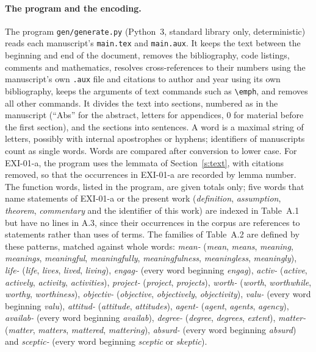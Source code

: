 \paragraph{The program and the encoding.} The program \texttt{gen/generate.py} (Python~3, standard library only, deterministic) reads each manuscript's \texttt{main.tex} and \texttt{main.aux}. It keeps the text between the beginning and end of the document, removes the bibliography, code listings, comments and mathematics, resolves cross-references to their numbers using the manuscript's own \texttt{.aux} file and citations to author and year using its own bibliography, keeps the arguments of text commands such as \texttt{\textbackslash emph}, and removes all other commands. It divides the text into sections, numbered as in the manuscript (\enquote{Abs} for the abstract, letters for appendices, 0 for material before the first section), and the sections into sentences. A word is a maximal string of letters, possibly with internal apostrophes or hyphens; identifiers of manuscripts count as single words. Words are compared after conversion to lower case. For EXI-01-a, the program uses the lemmata of Section~\ref{s:text}, with citations removed, so that the occurrences in EXI-01-a are recorded by lemma number. The function words, listed in the program, are given totals only; five words that name statements of EXI-01-a or the present work (\emph{definition}, \emph{assumption}, \emph{theorem}, \emph{commentary} and the identifier of this work) are indexed in Table~A.1 but have no lines in A.3, since their occurrences in the corpus are references to statements rather than uses of terms. The families of Table~A.2 are defined by these patterns, matched against whole words: \textit{mean-} (\emph{mean}, \emph{means}, \emph{meaning}, \emph{meanings}, \emph{meaningful}, \emph{meaningfully}, \emph{meaningfulness}, \emph{meaningless}, \emph{meaningly}), \textit{life-} (\emph{life}, \emph{lives}, \emph{lived}, \emph{living}), \textit{engag-} (every word beginning \emph{engag}), \textit{activ-} (\emph{active}, \emph{actively}, \emph{activity}, \emph{activities}), \textit{project-} (\emph{project}, \emph{projects}), \textit{worth-} (\emph{worth}, \emph{worthwhile}, \emph{worthy}, \emph{worthiness}), \textit{objectiv-} (\emph{objective}, \emph{objectively}, \emph{objectivity}), \textit{valu-} (every word beginning \emph{valu}), \textit{attitud-} (\emph{attitude}, \emph{attitudes}), \textit{agent-} (\emph{agent}, \emph{agents}, \emph{agency}), \textit{availab-} (every word beginning \emph{availab}), \textit{degree-} (\emph{degree}, \emph{degrees}, \emph{extent}), \textit{matter-} (\emph{matter}, \emph{matters}, \emph{mattered}, \emph{mattering}), \textit{absurd-} (every word beginning \emph{absurd}) and \textit{sceptic-} (every word beginning \emph{sceptic} or \emph{skeptic}).

